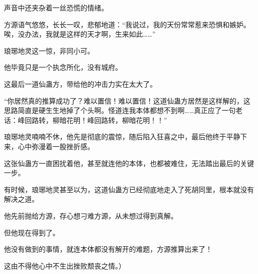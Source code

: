 \begin{this_body}
声音中还夹杂着一丝恐慌的情绪。

方源语气悠悠，长长一叹，悲郁地道：“我说过，我的天份常常惹来恐惧和嫉妒。唉，没办法，我就是这样的天才啊，生来如此……”

琅琊地灵这一惊，非同小可。

他毕竟只是一个执念所化，没有城府。

这最后一道仙蛊方，带给他的冲击力实在太大了。

“你居然真的推算成功了？难以置信！难以置信！这道仙蛊方居然是这样解的，这思路简直是硬生生地掉了个头啊。怪道连我本体都想不到啊……真正应了一句老话：峰回路转，柳暗花明！峰回路转，柳暗花明！！”

琅琊地灵喃喃不休，他先是彻底的震惊，随后陷入狂喜之中，最后他终于平静下来，心中弥漫着一股挫折感。

这张仙蛊方一直困扰着他，甚至就连他的本体，也都被难住，无法踏出最后的关键一步。

有时候，琅琊地灵甚至以为，这道仙蛊方已经彻底地走入了死胡同里，根本就没有解决之道。

他先前抛给方源，存心想刁难方源，从未想过得到真解。

但他现在得到了。

他没有做到的事情，就连本体都没有解开的难题，方源推算出来了！

这由不得他心中不生出挫败颓丧之情。）

\end{this_body}

